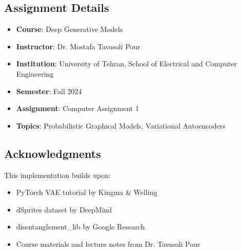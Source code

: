 \documentclass[conference]{IEEEtran}
\begin{document}
\subsection{Assignment Details}
\begin{itemize}
    \item \textbf{Course}: Deep Generative Models
    \item \textbf{Instructor}: Dr. Mostafa Tavasoli Pour
    \item \textbf{Institution}: University of Tehran, School of Electrical and Computer Engineering
    \item \textbf{Semester}: Fall 2024
    \item \textbf{Assignment}: Computer Assignment 1
    \item \textbf{Topics}: Probabilistic Graphical Models, Variational Autoencoders
\end{itemize}

\subsection{Acknowledgments}

This implementation builds upon:
\begin{itemize}
    \item PyTorch VAE tutorial by Kingma \& Welling
    \item dSprites dataset by DeepMind
    \item disentanglement\_lib by Google Research
    \item Course materials and lecture notes from Dr. Tavasoli Pour
\end{itemize}
\end{document}
